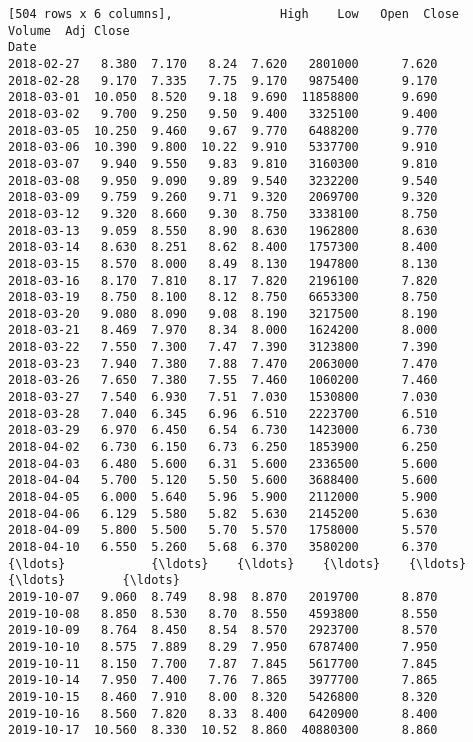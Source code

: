\documentclass[11pt]{article}
\begin{document}
\begin{Verbatim}[commandchars=\\\{\}]
[504 rows x 6 columns],               High    Low   Open  Close    Volume  Adj Close
Date                                                        
2018-02-27   8.380  7.170   8.24  7.620   2801000      7.620
2018-02-28   9.170  7.335   7.75  9.170   9875400      9.170
2018-03-01  10.050  8.520   9.18  9.690  11858800      9.690
2018-03-02   9.700  9.250   9.50  9.400   3325100      9.400
2018-03-05  10.250  9.460   9.67  9.770   6488200      9.770
2018-03-06  10.390  9.800  10.22  9.910   5337700      9.910
2018-03-07   9.940  9.550   9.83  9.810   3160300      9.810
2018-03-08   9.950  9.090   9.89  9.540   3232200      9.540
2018-03-09   9.759  9.260   9.71  9.320   2069700      9.320
2018-03-12   9.320  8.660   9.30  8.750   3338100      8.750
2018-03-13   9.059  8.550   8.90  8.630   1962800      8.630
2018-03-14   8.630  8.251   8.62  8.400   1757300      8.400
2018-03-15   8.570  8.000   8.49  8.130   1947800      8.130
2018-03-16   8.170  7.810   8.17  7.820   2196100      7.820
2018-03-19   8.750  8.100   8.12  8.750   6653300      8.750
2018-03-20   9.080  8.090   9.08  8.190   3217500      8.190
2018-03-21   8.469  7.970   8.34  8.000   1624200      8.000
2018-03-22   7.550  7.300   7.47  7.390   3123800      7.390
2018-03-23   7.940  7.380   7.88  7.470   2063000      7.470
2018-03-26   7.650  7.380   7.55  7.460   1060200      7.460
2018-03-27   7.540  6.930   7.51  7.030   1530800      7.030
2018-03-28   7.040  6.345   6.96  6.510   2223700      6.510
2018-03-29   6.970  6.450   6.54  6.730   1423000      6.730
2018-04-02   6.730  6.150   6.73  6.250   1853900      6.250
2018-04-03   6.480  5.600   6.31  5.600   2336500      5.600
2018-04-04   5.700  5.120   5.50  5.600   3688400      5.600
2018-04-05   6.000  5.640   5.96  5.900   2112000      5.900
2018-04-06   6.129  5.580   5.82  5.630   2145200      5.630
2018-04-09   5.800  5.500   5.70  5.570   1758000      5.570
2018-04-10   6.550  5.260   5.68  6.370   3580200      6.370
{\ldots}            {\ldots}    {\ldots}    {\ldots}    {\ldots}       {\ldots}        {\ldots}
2019-10-07   9.060  8.749   8.98  8.870   2019700      8.870
2019-10-08   8.850  8.530   8.70  8.550   4593800      8.550
2019-10-09   8.764  8.450   8.54  8.570   2923700      8.570
2019-10-10   8.575  7.889   8.29  7.950   6787400      7.950
2019-10-11   8.150  7.700   7.87  7.845   5617700      7.845
2019-10-14   7.950  7.400   7.76  7.865   3977700      7.865
2019-10-15   8.460  7.910   8.00  8.320   5426800      8.320
2019-10-16   8.560  7.820   8.33  8.400   6420900      8.400
2019-10-17  10.560  8.330  10.52  8.860  40880300      8.860

\end{Verbatim}
\end{document}
